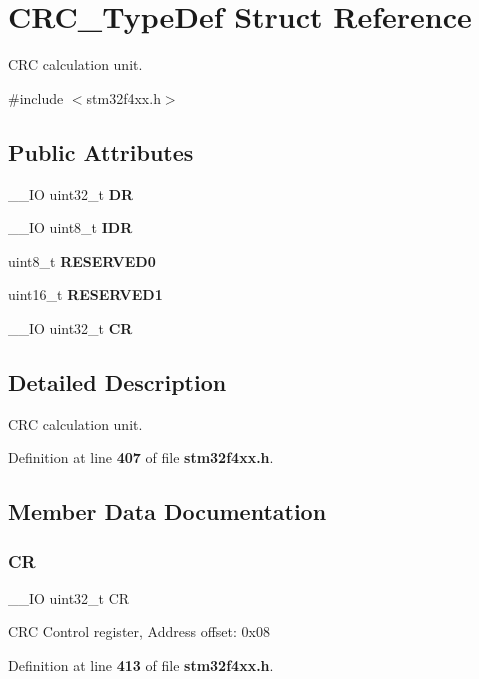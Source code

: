 \section{C\+R\+C\+\_\+\+Type\+Def Struct Reference}
\label{structCRC__TypeDef}


C\+RC calculation unit.  




{\ttfamily \#include $<$stm32f4xx.\+h$>$}

\subsection*{Public Attributes}
\begin{DoxyCompactItemize}
\item 
\+\_\+\+\_\+\+IO uint32\+\_\+t \textbf{ DR}
\item 
\+\_\+\+\_\+\+IO uint8\+\_\+t \textbf{ I\+DR}
\item 
uint8\+\_\+t \textbf{ R\+E\+S\+E\+R\+V\+E\+D0}
\item 
uint16\+\_\+t \textbf{ R\+E\+S\+E\+R\+V\+E\+D1}
\item 
\+\_\+\+\_\+\+IO uint32\+\_\+t \textbf{ CR}
\end{DoxyCompactItemize}


\subsection{Detailed Description}
C\+RC calculation unit. 

Definition at line \textbf{ 407} of file \textbf{ stm32f4xx.\+h}.



\subsection{Member Data Documentation}
\mbox{\label{structCRC__TypeDef_ab40c89c59391aaa9d9a8ec011dd0907a}} 
\subsubsection{CR}
{\footnotesize\ttfamily \+\_\+\+\_\+\+IO uint32\+\_\+t CR}

C\+RC Control register, Address offset\+: 0x08 

Definition at line \textbf{ 413} of file \textbf{ stm32f4xx.\+h}.

